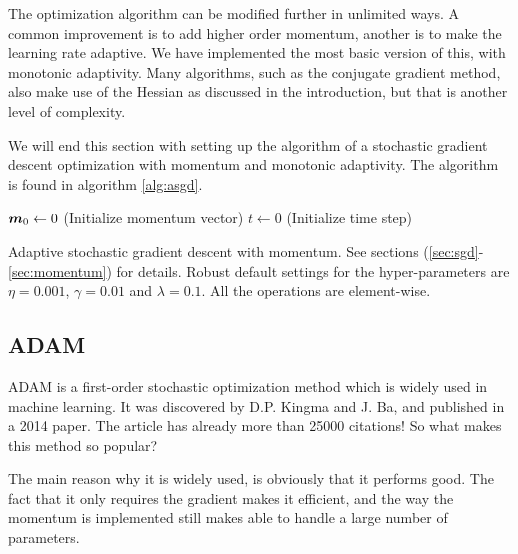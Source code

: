 The optimization algorithm can be modified further in unlimited ways. A common improvement is to add higher order momentum, another is to make the learning rate adaptive. We have implemented the most basic version of this, with monotonic adaptivity. Many algorithms, such as the conjugate gradient method, also make use of the Hessian as discussed in the introduction, but that is another level of complexity. 

We will end this section with setting up the algorithm of a stochastic gradient descent optimization with momentum and monotonic adaptivity. The algorithm is found in algorithm \eqref{alg:asgd}.

\IncMargin{1em}
\begin{algorithm}
	\SetAlgoLined
	
	$\boldsymbol{{m}}_0\leftarrow 0$ (Initialize momentum vector)\;
	$t\leftarrow 0$ (Initialize time step)\;
	\caption{Adaptive stochastic gradient descent with momentum. See sections (\ref{sec:sgd}-\ref{sec:momentum}) for details. Robust default settings for the hyper-parameters are $\eta=0.001$, $\gamma=0.01$ and $\lambda=0.1$. All the operations are element-wise.}
	\label{alg:asgd}
\end{algorithm}\DecMargin{1em}

\subsection{ADAM}
ADAM is a first-order stochastic optimization method which is widely used in machine learning. It was discovered by D.P. Kingma and J. Ba, and published in a 2014 paper. The article has already more than 25000 citations! \cite{kingma_adam:_2014} So what makes this method so popular? 

The main reason why it is widely used, is obviously that it performs good. The fact that it only requires the gradient makes it efficient, and the way the momentum is implemented still makes able to handle a large number of parameters. 


